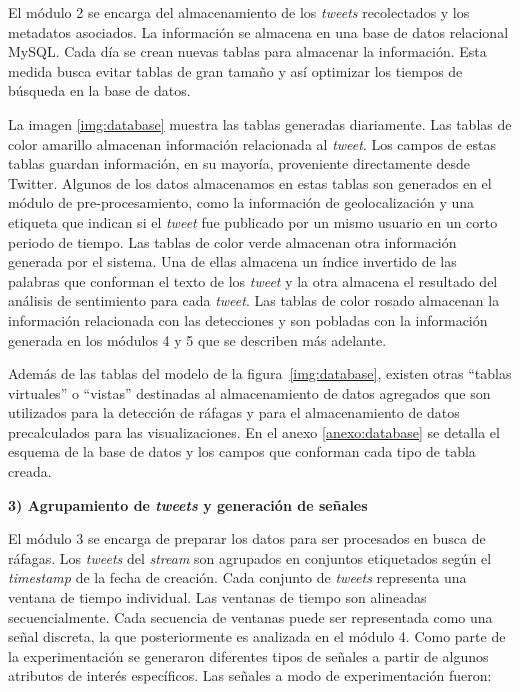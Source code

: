 El módulo 2 se encarga del almacenamiento de los \textit{tweets} recolectados y los metadatos asociados. La información se almacena en una base de datos relacional MySQL. 
%
Cada día se crean nuevas tablas para almacenar la información. Esta medida busca evitar tablas de gran tamaño y así optimizar los tiempos de búsqueda en la base de datos. 


La imagen \ref{img:database} muestra las tablas generadas diariamente. 
%
Las tablas de color amarillo almacenan información relacionada al \textit{tweet}. 
%
Los campos de estas tablas guardan información, en su mayoría, proveniente directamente desde Twitter.
%
Algunos de los datos almacenamos en estas tablas son generados en el módulo de pre-procesamiento, como la información de geolocalización y una etiqueta que indican si el \textit{tweet} fue publicado por un mismo usuario en un corto periodo de tiempo.
%
Las tablas de color verde almacenan otra información generada por el sistema.
%
Una de ellas almacena un índice invertido de las palabras que conforman el texto de los \textit{tweet} y la otra almacena el resultado del análisis de sentimiento para cada \textit{tweet}. 
%
Las tablas de color rosado almacenan la información relacionada con las detecciones y son pobladas con la información generada en los módulos 4 y 5 que se describen más adelante. 


Además de las tablas del modelo de la figura~\ref{img:database}, existen otras ``tablas virtuales'' o ``vistas'' destinadas al almacenamiento de datos agregados que son utilizados para la detección de ráfagas y para el almacenamiento de datos precalculados para las visualizaciones.
%
En el anexo \ref{anexo:database} se detalla el esquema de la base de datos y los campos que conforman cada tipo de tabla creada.

\noindent\textbf{3) Agrupamiento de \textit{tweets} y generación de señales}

El módulo 3 se encarga de preparar los datos para ser procesados en busca de ráfagas.
%
Los \textit{tweets} del \textit{stream} son agrupados en conjuntos etiquetados según el \textit{timestamp} de la fecha de creación. 
%
Cada conjunto de \textit{tweets} representa una ventana de tiempo individual. 
%
Las ventanas de tiempo son alineadas secuencialmente.
%
Cada secuencia de ventanas puede ser representada como una señal discreta, la que posteriormente es analizada en el módulo 4. 
%
Como parte de la experimentación se generaron diferentes tipos de señales a partir de algunos atributos de interés específicos. %
%
Las señales a modo de experimentación fueron:


